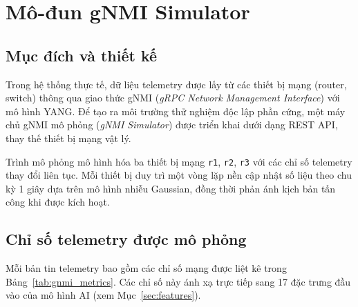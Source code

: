 \documentclass[12pt,a4paper]{article}
\begin{document}
\section{Mô-đun gNMI Simulator}

\subsection{Mục đích và thiết kế}

Trong hệ thống thực tế, dữ liệu telemetry được lấy từ các thiết bị mạng (router, switch) thông qua giao thức gNMI (\textit{gRPC Network Management Interface}) với mô hình YANG. Để tạo ra môi trường thử nghiệm độc lập phần cứng, một máy chủ gNMI mô phỏng (\textit{gNMI Simulator}) được triển khai dưới dạng REST API, thay thế thiết bị mạng vật lý.

Trình mô phỏng mô hình hóa ba thiết bị mạng \texttt{r1}, \texttt{r2}, \texttt{r3} với các chỉ số telemetry thay đổi liên tục. Mỗi thiết bị duy trì một vòng lặp nền cập nhật số liệu theo chu kỳ 1 giây dựa trên mô hình nhiễu Gaussian, đồng thời phản ánh kịch bản tấn công khi được kích hoạt.

\subsection{Chỉ số telemetry được mô phỏng}

Mỗi bản tin telemetry bao gồm các chỉ số mạng được liệt kê trong Bảng~\ref{tab:gnmi_metrics}. Các chỉ số này ánh xạ trực tiếp sang 17 đặc trưng đầu vào của mô hình AI (xem Mục~\ref{sec:features}).
\end{document}
